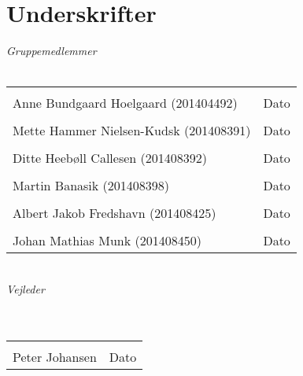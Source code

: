 \chapter{Underskrifter}

\begin{vplace}[0.6]

{\large \textit{Gruppemedlemmer}}
\\
\\

\noindent \begin{tabular}{ll}
	\makebox[3in]{\hrulefill} & \makebox[1.5in]{\hrulefill}\\
	Anne Bundgaard Hoelgaard (201404492) & Dato\\[7ex]
	\makebox[3in]{\hrulefill} & \makebox[1.5in]{\hrulefill}\\
	Mette Hammer Nielsen-Kudsk  (201408391) & Dato\\[7ex]
	\makebox[3in]{\hrulefill} & \makebox[1.5in]{\hrulefill}\\
	Ditte Heebøll Callesen  (201408392) & Dato\\[7ex]
	\makebox[3in]{\hrulefill} & \makebox[1.5in]{\hrulefill}\\
	Martin Banasik  (201408398) & Dato\\[7ex]
	\makebox[3.0in]{\hrulefill} & \makebox[1.5in]{\hrulefill}\\
	Albert Jakob Fredshavn  (201408425) & Dato\\[7ex]%
	\makebox[3in]{\hrulefill} & \makebox[1.5in]{\hrulefill}\\
	Johan Mathias Munk  (201408450) & Dato\\[7ex]
	
	
	
\end{tabular}
\\
{\large \textit{Vejleder}}
\\
\\
\\
\noindent \begin{tabular}{ll}
	\makebox[3.0in]{\hrulefill} & \makebox[1.5in]{\hrulefill}\\
	Peter Johansen & Dato\\[8ex]
\end{tabular}
\end{vplace}
